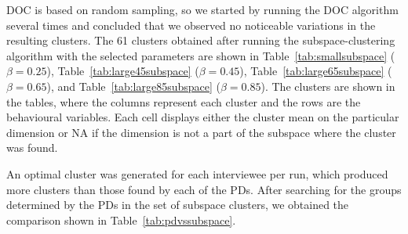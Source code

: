 
DOC is based on random sampling, so we started by running the DOC algorithm several times and concluded that we observed no noticeable variations in the resulting clusters. The 61 clusters obtained after running the subspace-clustering algorithm with the selected parameters are shown in Table~\ref{tab:smallsubspace} ($\beta=0.25$), Table~\ref{tab:large45subspace} ($\beta=0.45$), Table~\ref{tab:large65subspace} ($\beta=0.65$), and Table~\ref{tab:large85subspace} ($\beta=0.85$). The clusters are shown in the tables, where the columns represent each cluster and the rows are the behavioural variables. Each cell displays either the cluster mean on the particular dimension or NA if the dimension is not a part of the subspace where the cluster was found. %

An optimal cluster was generated for each interviewee per run, which produced more clusters than those found by each of the PDs. After searching for the groups determined by the PDs in the set of subspace clusters, we obtained the comparison shown in Table~\ref{tab:pdvssubspace}.


